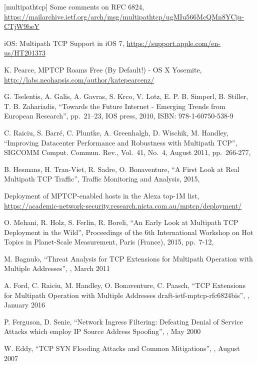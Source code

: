 \begin{thebibliography}{99}
[multipathtcp] Some comments on RFC 6824,
\url{https://mailarchive.ietf.org/arch/msg/multipathtcp/ugMIu566McQMn8YCju-CTjW9beY}

iOS: Multipath TCP Support in iOS 7,
\url{https://support.apple.com/en-us/HT201373}

K. Pearce, MPTCP Roams Free (By Default!) - OS X Yosemite,
\url{http://labs.neohapsis.com/author/katepearcenz/}

G. Tselentis, A. Galis, A. Gavras, S. Krco, V. Lotz, E. P. B. Simperl, B. Stiller, T. B. Zahariadis, 
``Towards the Future Internet - Emerging Trends from European Research'',
pp.\ 21--23,
IOS press, 2010,
ISBN: 978-1-60750-538-9

C. Raiciu, S. Barr{\'e}, C. Pluntke, A. Greenhalgh, D. Wischik, M. Handley,
``Improving Datacenter Performance and Robustness with Multipath TCP'', 
SIGCOMM Comput. Commun. Rev., 
Vol.\ 41, No.\ 4,
August 2011, 
pp.\ 266-277,

B. Hesmans, H. Tran-Viet, R. Sadre, O. Bonaventure, 
``A First Look at Real Multipath TCP Traffic'',
Traffic Monitoring and Analysis,
2015,

Deployment of MPTCP-enabled hosts in the Alexa top-1M list,
\url{https://academic-network-security.research.nicta.com.au/mptcp/deployment/}

O. Mehani, R. Holz, S. Ferlin, R. Boreli,
``An Early Look at Multipath TCP Deployment in the Wild'',
Proceedings of the 6th International Workshop on Hot Topics in Planet-Scale Measurement, 
Paris (France), 2015,
pp.\ 7-12, 

M. Bagnulo,
``Threat Analysis for TCP Extensions for Multipath Operation with Multiple Addresses'',
,  March 2011

A. Ford, C. Raiciu, M. Handley, O. Bonaventure, C. Paasch,
``TCP Extensions for Multipath Operation with Multiple Addresses draft-ietf-mptcp-rfc6824bis'',
,  January 2016

P. Ferguson, D. Senie,
``Network Ingress Filtering: Defeating Denial of Service Attacks which employ IP Source Address Spoofing'',
,  May 2000

W. Eddy,
``TCP SYN Flooding Attacks and Common Mitigations'',
,  August 2007


\end{thebibliography}
